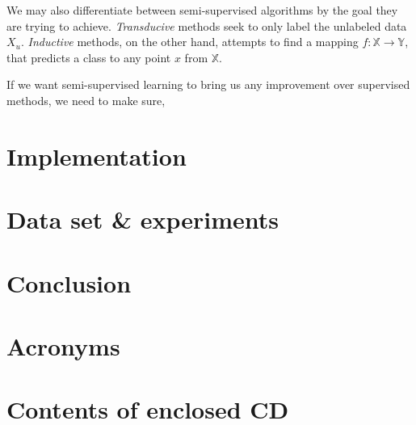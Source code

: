 \documentclass[thesis=M,english]{FITthesis}[2012/10/20]
\begin{document}
We may also differentiate between semi-supervised algorithms by the goal they are trying to achieve. \emph{Transducive} methods seek to only label the unlabeled data \(X_u\). \emph{Inductive} methods, on the other hand,
attempts to find a mapping \(f: \mathbb{X} \rightarrow \mathbb{Y}\), that predicts a class to any point \(x\) from \(\mathbb{X}\).

If we want semi-supervised learning to bring us any improvement over supervised methods, we need to make sure, 
\chapter{Implementation}
\chapter{Data set {\&} experiments}

\chapter{Conclusion}





\appendix

\chapter{Acronyms}


\chapter{Contents of enclosed CD}


\end{document}

